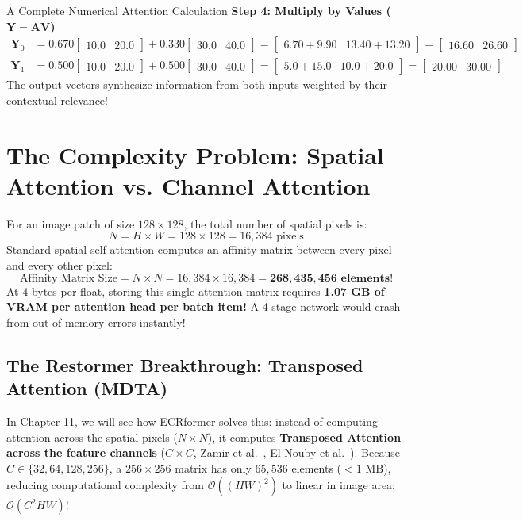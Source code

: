 \begin{mathbox}{A Complete Numerical Attention Calculation}
\textbf{Step 4: Multiply by Values ($\mathbf{Y} = \mathbf{A}\mathbf{V}$)}
\begin{align*}
\mathbf{Y}_{0} &= 0.670 \begin{bmatrix} 10.0 & 20.0 \end{bmatrix} + 0.330 \begin{bmatrix} 30.0 & 40.0 \end{bmatrix} = \begin{bmatrix} 6.70 + 9.90 & 13.40 + 13.20 \end{bmatrix} = \begin{bmatrix} \mathbf{16.60} & \mathbf{26.60} \end{bmatrix} \\
\mathbf{Y}_{1} &= 0.500 \begin{bmatrix} 10.0 & 20.0 \end{bmatrix} + 0.500 \begin{bmatrix} 30.0 & 40.0 \end{bmatrix} = \begin{bmatrix} 5.0 + 15.0 & 10.0 + 20.0 \end{bmatrix} = \begin{bmatrix} \mathbf{20.00} & \mathbf{30.00} \end{bmatrix}
\end{align*}
The output vectors synthesize information from both inputs weighted by their contextual relevance!
\end{mathbox}

\section{The Complexity Problem: Spatial Attention vs. Channel Attention}
For an image patch of size $128 \times 128$, the total number of spatial pixels is:
\[
N = H \times W = 128 \times 128 = 16{,}384\text{ pixels}
\]
Standard spatial self-attention computes an affinity matrix between every pixel and every other pixel:
\[
\text{Affinity Matrix Size} = N \times N = 16{,}384 \times 16{,}384 = \mathbf{268{,}435{,}456\text{ elements!}}
\]
At 4 bytes per float, storing this single attention matrix requires \textbf{1.07 GB of VRAM per attention head per batch item!} A 4-stage network would crash from out-of-memory errors instantly!

\subsection{The Restormer Breakthrough: Transposed Attention (MDTA)}
In Chapter 11, we will see how ECRformer solves this: instead of computing attention across the spatial pixels ($N \times N$), it computes \textbf{Transposed Attention across the feature channels} ($C \times C$, Zamir et al.~\cite{zamir2022restormer}, El-Nouby et al.~\cite{elnouby2021xcit}). Because $C \in \{32, 64, 128, 256\}$, a $256 \times 256$ matrix has only $65{,}536$ elements ($<1\text{ MB}$), reducing computational complexity from $\mathcal{O}((HW)^2)$ to linear in image area: $\mathcal{O}(C^2 HW)$!

